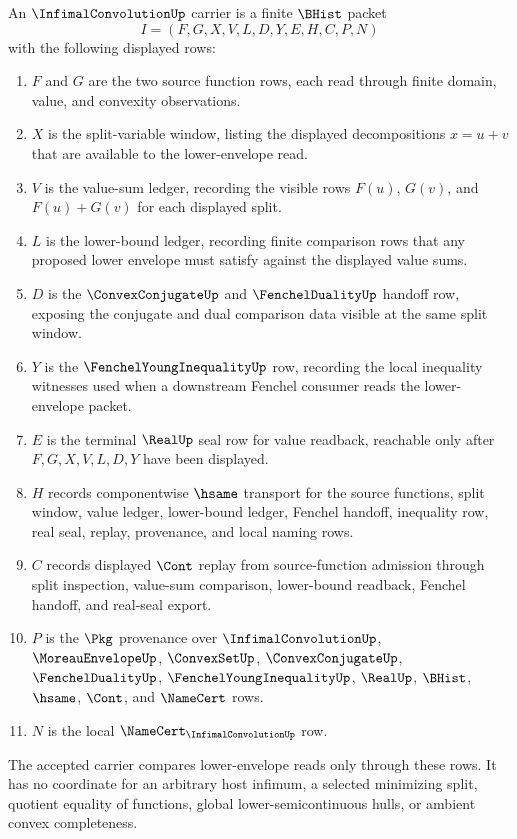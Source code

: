 \begin{definition}
\label{def:infimal-convolution-carrier}
An $\InfimalConvolutionUp$ carrier is a finite $\BHist$ packet
$$
I=(F,G,X,V,L,D,Y,E,H,C,P,N)
$$
with the following displayed rows:
\begin{enumerate}
\item $F$ and $G$ are the two source function rows, each read through finite domain, value, and convexity observations.
\item $X$ is the split-variable window, listing the displayed decompositions $x=u+v$ that are available to the lower-envelope read.
\item $V$ is the value-sum ledger, recording the visible rows $F(u)$, $G(v)$, and $F(u)+G(v)$ for each displayed split.
\item $L$ is the lower-bound ledger, recording finite comparison rows that any proposed lower envelope must satisfy against the displayed value sums.
\item $D$ is the $\ConvexConjugateUp$ and $\FenchelDualityUp$ handoff row, exposing the conjugate and dual comparison data visible at the same split window.
\item $Y$ is the $\FenchelYoungInequalityUp$ row, recording the local inequality witnesses used when a downstream Fenchel consumer reads the lower-envelope packet.
\item $E$ is the terminal $\RealUp$ seal row for value readback, reachable only after $F,G,X,V,L,D,Y$ have been displayed.
\item $H$ records componentwise $\hsame$ transport for the source functions, split window, value ledger, lower-bound ledger, Fenchel handoff, inequality row, real seal, replay, provenance, and local naming rows.
\item $C$ records displayed $\Cont$ replay from source-function admission through split inspection, value-sum comparison, lower-bound readback, Fenchel handoff, and real-seal export.
\item $P$ is the $\Pkg$ provenance over $\InfimalConvolutionUp$, $\MoreauEnvelopeUp$, $\ConvexSetUp$, $\ConvexConjugateUp$, $\FenchelDualityUp$, $\FenchelYoungInequalityUp$, $\RealUp$, $\BHist$, $\hsame$, $\Cont$, and $\NameCert$ rows.
\item $N$ is the local $\NameCert_{\InfimalConvolutionUp}$ row.
\end{enumerate}
The accepted carrier compares lower-envelope reads only through these rows. It has no coordinate for an arbitrary host infimum, a selected minimizing split, quotient equality of functions, global lower-semicontinuous hulls, or ambient convex completeness.
\end{definition}

